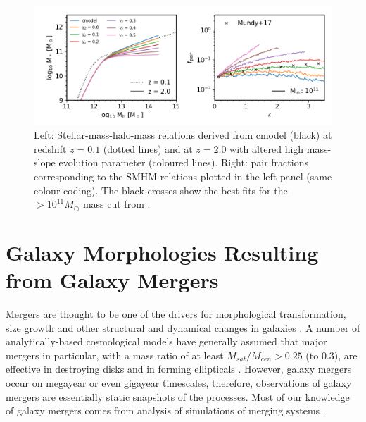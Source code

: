 \begin{figure}
    \centering
    \includegraphics[width = \linewidth]{Figures/Chapter5/PairFractionHMevo.png}
    \caption{Left: Stellar-mass-halo-mass relations derived from cmodel (black) at redshift $z = 0.1$ (dotted lines) and at $z = 2.0$ with altered high mass-slope evolution parameter (coloured lines). Right: pair fractions corresponding to the SMHM relations plotted in the left panel (same colour coding). The black crosses show the best fits for the $>10^{11}M_{\odot}$ mass cut from \citet{Mundy2017A3.5}.}
    \label{fig:PairFractionHMevo}
\end{figure}

\section{Galaxy Morphologies Resulting from Galaxy Mergers}

Mergers are thought to be one of the drivers for morphological transformation, size growth and other structural and dynamical changes in galaxies \citep{Bournaud2007, Hopkins2009TheDemographics, Hopkins2010MergersFunctions, Shankar2011SizeUniverse, Fontanot2015OnMergers}. A number of analytically-based cosmological models have generally assumed that major mergers in particular, with a mass ratio of at least $M_{sat}/M_{cen} > 0.25$ (to 0.3), are effective in destroying disks and in forming ellipticals \citep{Baugh2006AApproach, Malbon2007BlackFormation, Bower2010TheFormation}. However, galaxy mergers occur on megayear or even gigayear timescales, therefore, observations of galaxy mergers are essentially static snapshots of the processes. Most of our knowledge of galaxy mergers comes from analysis of simulations of merging systems \cite[e..g.][]{Hopkins2006ASpheroids,Hopkins2009TheDemographics, Hopkins2010MergersRate,Hopkins2009HOWMERGERS,Hopkins2010MERGERSMATTER,OLeary2020EMERGE:zsim6,Fensch2017High-redshiftFormation,Stewart2008MergerSurvival,Stewart2009GALAXYDEPENDENCE}. 

